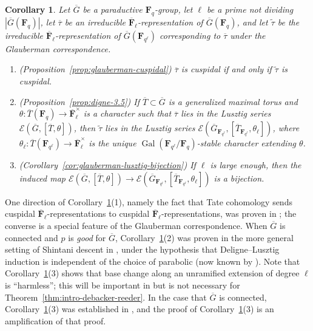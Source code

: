 \documentclass[reqno]{amsart}
\numberwithin{equation}{subsection}
\newcommand{\F}{\mathbf{F}}
\newcommand{\wt}[1]{\widetilde{#1}}
\newcommand{\Gal}{\operatorname{Gal}}
\newcommand{\ol}[1]{\overline{#1}}
\newcommand{\co}{\colon}
\newcommand\cE{\mathcal{E}}
\newtheorem{cor}[thm]{Corollary}
\theoremstyle{remark}
\numberwithin{equation}{subsection}
\numberwithin{figure}{subsection}
\begin{document}
\begin{cor}\label{cor:intro-glauberman-properties}
    Let $\ol G$ be a paraductive $\F_q$-group, let $\ell$ be a prime not dividing $|\ol G(\F_q)|$, let $\ol\tau$ be an irreducible $\ol\F_\ell$-representation of $\ol G(\F_q)$, and let $\wt\tau$ be the irreducible $\ol\F_\ell$-representation of $\ol G(\F_{q^\ell})$ corresponding to $\ol\tau$ under the Glauberman correspondence.
    \begin{enumerate}
        \item (Proposition~\ref{prop:glauberman-cuspidal}) $\ol\tau$ is cuspidal if and only if $\wt\tau$ is cuspidal.
        \item (Proposition~\ref{prop:digne-3.5}) If $\ol T \subset \ol G$ is a generalized maximal torus and $\theta\co \ol T(\F_q) \to \ol\F_\ell^\times$ is a character such that $\ol\tau$ lies in the Lusztig series $\cE(\ol G, [\ol T, \theta])$, then $\wt\tau$ lies in the Lusztig series $\cE(\ol G_{\F_{q^\ell}}, [\ol T_{\F_{q^\ell}}, \theta_\ell])$, where $\theta_\ell\co \ol T(\F_{q^\ell}) \to \ol\F_\ell^\times$ is the unique $\Gal(\F_{q^\ell}/\F_q)$-stable character extending $\theta$.
        \item (Corollary~\ref{cor:glauberman-lusztig-bijection}) If $\ell$ is large enough, then the induced map $\cE(\ol G, [\ol T, \theta]) \to \cE(\ol G_{\F_{q^\ell}}, [\ol T_{\F_{q^\ell}}, \theta_\ell])$ is a bijection.
    \end{enumerate}
\end{cor}

One direction of Corollary~\ref{cor:intro-glauberman-properties}(1), namely the fact that Tate cohomology sends cuspidal $\ol\F_\ell$-representations to cuspidal $\ol\F_\ell$-representations, was proven in \cite[Corollary~3.3.3]{DN25a}; the converse is a special feature of the Glauberman correspondence. When $\ol G$ is connected and $p$ is \emph{good} for $\ol G$, Corollary~\ref{cor:intro-glauberman-properties}(2) was proven in the more general setting of Shintani descent in \cite[Corollaire~3.5]{Dig99}, under the hypothesis that Deligne--Lusztig induction is independent of the choice of parabolic (now known by \cite[Theorem~8.7.2]{GRV26}). Note that Corollary~\ref{cor:intro-glauberman-properties}(3) shows that base change along an unramified extension of degree $\ell$ is ``harmless''; this will be important in \cite{CF26b} but is not necessary for Theorem~\ref{thm:intro-debacker-reeder}. In the case that $\ol G$ is connected, Corollary~\ref{cor:intro-glauberman-properties}(3) was established in \cite[Lemma~3.3]{Cot26a}, and the proof of Corollary~\ref{cor:intro-glauberman-properties}(3) is an amplification of that proof.
\end{document}
